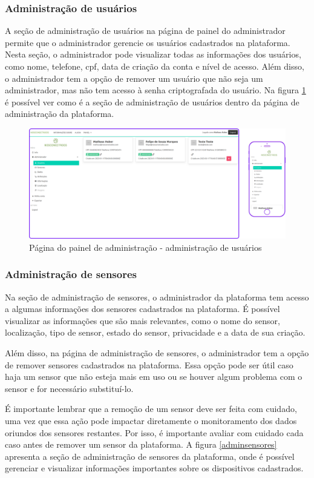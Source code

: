 \documentclass[tcc,capa]{texufpel}
\begin{document}
\subsubsection{Administração de usuários}
A seção de administração de usuários na página de painel do administrador permite que o administrador gerencie os usuários cadastrados na plataforma. Nesta seção, o administrador pode visualizar todas as informações dos usuários, como nome, telefone, cpf, data de criação da conta e nível de acesso.
Além disso, o administrador tem a opção de remover um usuário que não seja um administrador, mas não tem acesso à senha criptografada do usuário. Na figura \ref{adminusers} é possível ver como é a seção de administração de usuários dentro da página de administração da plataforma.
\begin{figure}[htbp]
  \centering \includegraphics[scale=.2]{assets/painelusuarios.png}
  \caption{Página do painel de administração - administração de usuários}
  \label{adminusers}
\end{figure}
\subsubsection{Administração de sensores}
Na seção de administração de sensores, o administrador da plataforma tem acesso a algumas informações dos sensores cadastrados na plataforma. É possível visualizar as informações que são mais relevantes, como o nome do sensor, localização, tipo de sensor, estado do sensor, privacidade e a data de sua criação.

Além disso, na página de administração de sensores, o administrador tem a opção de remover sensores cadastrados na plataforma. Essa opção pode ser útil caso haja um sensor que não esteja mais em uso ou se houver algum problema com o sensor e for necessário substituí-lo.

É importante lembrar que a remoção de um sensor deve ser feita com cuidado, uma vez que essa ação pode impactar diretamente o monitoramento dos dados oriundos dos sensores restantes. Por isso, é importante avaliar com cuidado cada caso antes de remover um sensor da plataforma. A figura \ref{adminsensores} apresenta a seção de administração de sensores da plataforma, onde é possível gerenciar e visualizar informações importantes sobre os dispositivos cadastrados.
\end{document}
